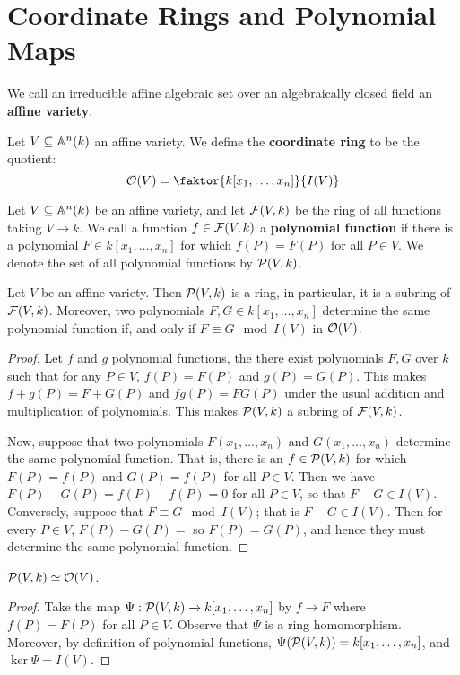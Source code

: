 \section{Coordinate Rings and Polynomial Maps}\label{section_2.1}

\begin{definition}
  We call an irreducible affine algebraic set over an algebraically closed field
  an \textbf{affine variety}.
\end{definition}

\begin{definition}
  Let $V \subseteq \mathbb{A}^n(k)$ an affine variety. We define the \textbf{coordinate
  ring} to be the quotient:
  \begin{equation*}
    \Oc(V)=\faktor{k[x_1, \dots, x_n]}{I(V)}
  \end{equation*}
\end{definition}

\begin{definition}
  Let $V \subseteq \mathbb{A}^n(k)$ be an affine variety, and let $\mathcal{F}(V,k)$ be the ring
  of all functions taking $V \xrightarrow{} k$. We call a function $f \in
  \mathcal{F}(V,k)$ a \textbf{polynomial function} if there is a polynomial $F \in
  k[x_1, \dots, x_n]$ for which $f(P)=F(P)$ for all $P \in V$. We denote the set
  of all polynomial functions by $\mathcal{P}(V,k)$.
\end{definition}

\begin{lemma}\label{lemma_2.1.1}
  Let $V$ be an affine variety. Then $\mathcal{P}(V,k)$ is a ring, in particular, it is
  a subring of $\mathcal{F}(V,k)$. Moreover, two polynomials $F,G \in k[x_1, \dots,
  x_n]$ determine the same polynomial function if, and only if $F \equiv G
  \mod{I(V)}$ in $\mathcal{O}(V)$.
\end{lemma}
\begin{proof}
  Let $f$ and  $g$ polynomial functions, the there exist polynomials $F,G$ over
  $k$ such that for any  $P \in V$, $f(P)=F(P)$ and $g(P)=G(P)$. This makes
  $f+g(P)=F+G(P)$ and $fg(P)=FG(P)$ under the usual addition and multiplication
  of polynomials. This makes $\mathcal{P}(V,k)$ a subring of $\mathcal{F}(V,k)$.

  Now, suppose that two polynomials $F(x_1, \dots, x_n)$ and $G(x_1, \dots,
  x_n)$ determine the same polynomial function. That is, there is an $f \in
  \mathcal{P}(V,k)$ for which $F(P)=f(P)$ and $G(P)=f(P)$ for all $P \in V$. Then we
  have $F(P)-G(P)=f(P)-f(P)=0$ for all $P \in V$, so that $F-G \in I(V)$.
  Conversely, suppose that $F \equiv G \mod{I(V)}$; that is $F-G \in I(V)$. Then
  for every $P \in V$, $F(P)-G(P)=$ so $F(P)=G(P)$, and hence they must
  determine the same polynomial function.
\end{proof}
\begin{corollary}
  $\mathcal{P}(V,k) \simeq \mathcal{O}(V)$.
\end{corollary}
\begin{proof}
  Take the map $\Psi: \mathcal{P}(V,k) \xrightarrow{} k[x_1, \dots, x_n]$ by $f
  \xrightarrow{} F$ where $f(P)=F(P)$ for all $P \in V$. Observe that $\Psi$ is
  a ring homomorphism. Moreover, by definition of polynomial functions,
  $\Psi(\mathcal{P}(V,k))=k[x_1, \dots, x_n]$, and $\ker{\Psi}=I(V)$.
\end{proof}

